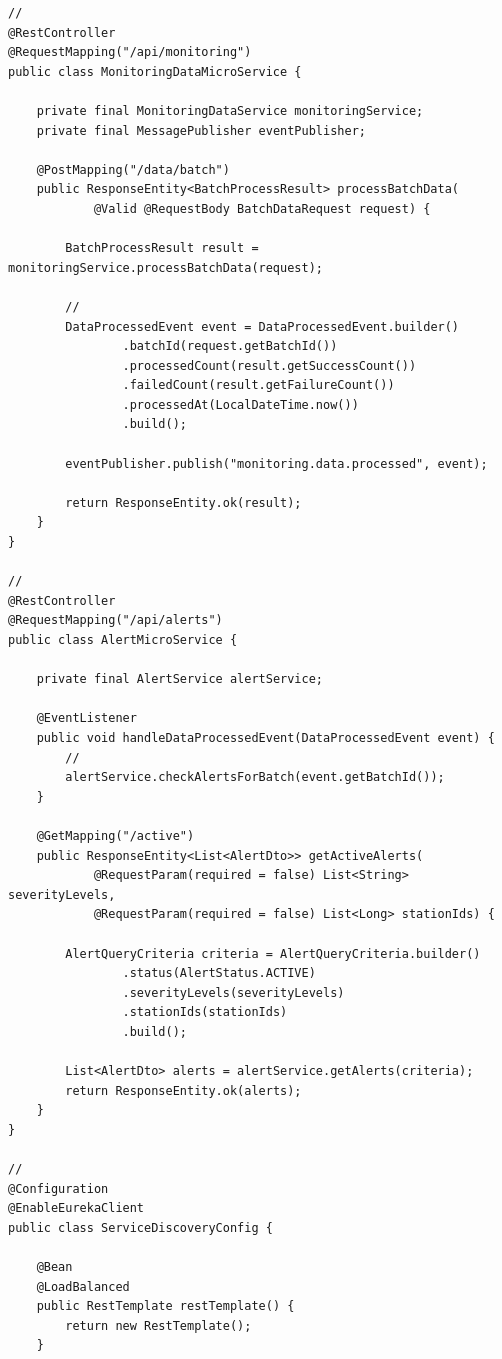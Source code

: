 \begin{lstlisting}[style=java]
// 
@RestController
@RequestMapping("/api/monitoring")
public class MonitoringDataMicroService {
    
    private final MonitoringDataService monitoringService;
    private final MessagePublisher eventPublisher;
    
    @PostMapping("/data/batch")
    public ResponseEntity<BatchProcessResult> processBatchData(
            @Valid @RequestBody BatchDataRequest request) {
        
        BatchProcessResult result = monitoringService.processBatchData(request);
        
        // 
        DataProcessedEvent event = DataProcessedEvent.builder()
                .batchId(request.getBatchId())
                .processedCount(result.getSuccessCount())
                .failedCount(result.getFailureCount())
                .processedAt(LocalDateTime.now())
                .build();
                
        eventPublisher.publish("monitoring.data.processed", event);
        
        return ResponseEntity.ok(result);
    }
}

//   
@RestController
@RequestMapping("/api/alerts")
public class AlertMicroService {
    
    private final AlertService alertService;
    
    @EventListener
    public void handleDataProcessedEvent(DataProcessedEvent event) {
        // 
        alertService.checkAlertsForBatch(event.getBatchId());
    }
    
    @GetMapping("/active")
    public ResponseEntity<List<AlertDto>> getActiveAlerts(
            @RequestParam(required = false) List<String> severityLevels,
            @RequestParam(required = false) List<Long> stationIds) {
        
        AlertQueryCriteria criteria = AlertQueryCriteria.builder()
                .status(AlertStatus.ACTIVE)
                .severityLevels(severityLevels)
                .stationIds(stationIds)
                .build();
                
        List<AlertDto> alerts = alertService.getAlerts(criteria);
        return ResponseEntity.ok(alerts);
    }
}

// 
@Configuration
@EnableEurekaClient
public class ServiceDiscoveryConfig {
    
    @Bean
    @LoadBalanced
    public RestTemplate restTemplate() {
        return new RestTemplate();
    }
    

\end{lstlisting}
